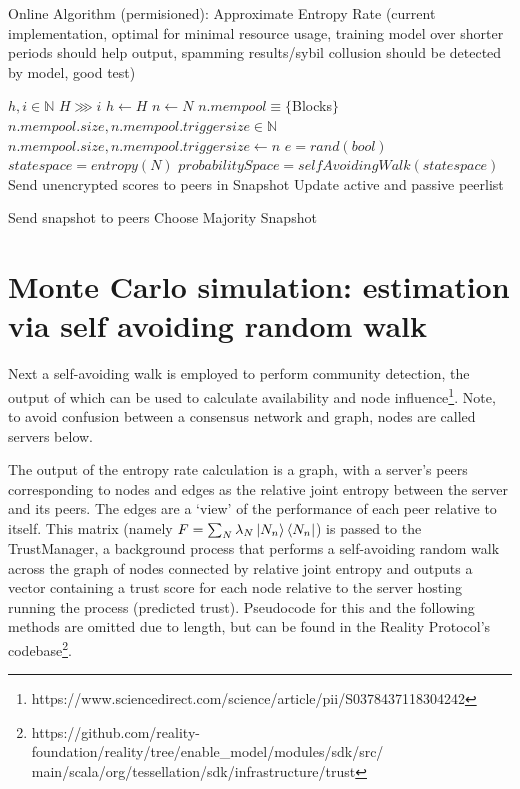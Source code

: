 \documentclass{article}
\begin{document}
\begin{algorithm}
\caption{Online Algorithm (permisioned): Approximate Entropy Rate (current implementation, optimal for minimal resource usage, training model over shorter periods should help output, spamming results/sybil collusion should be detected by model, good test)}\label{alg:cap}
\begin{algorithmic}
\State $h, i \in \mathbb{N}$
\State $H \ggg  i$
\State $h \gets H$
\State $n \gets N$ 
\State $n.mempool \equiv \{ $Blocks$ \}$
\State $n.mempool.size, n.mempool.triggersize \in \mathbb{N}$
\State  $n.mempool.size, n.mempool.triggersize \gets n$ 
\State $e = rand(bool) $ 
		 \State $state space = entropy(N)$ 
   	 	\State $probabilitySpace = selfAvoidingWalk (state space)$  
	 	\State Send unencrypted scores to peers in Snapshot
	 	\State Update active and passive peerlist
		
			\State Send snapshot to peers
			\State Choose Majority Snapshot
	\EndIf
\EndWhile
\end{algorithmic}
\end{algorithm}

\section{Monte Carlo simulation: estimation via self avoiding random walk}
Next a self-avoiding walk is employed to perform community detection, the output of which can be used to calculate availability and node influence\footnote{https://www.sciencedirect.com/science/article/pii/S0378437118304242}. Note, to avoid confusion between a consensus network and graph, nodes are called servers below.

The output of the entropy rate calculation is a graph, with a server’s peers corresponding to nodes and edges as the relative joint entropy between the server and its peers. The edges are a ‘view’ of the performance of each peer relative to itself. This matrix (namely $F = \sum_N \lambda_N \ket{N_n} \bra{N_n}$) is passed to the TrustManager, a background process that performs a self-avoiding random walk across the graph of nodes connected by relative joint entropy and outputs a vector containing a trust score for each node relative to the server hosting running the process (predicted trust). Pseudocode for this and the following methods are omitted due to length, but can be found in the Reality Protocol's codebase\footnote{https://github.com/reality-foundation/reality/tree/enable\_model/modules/sdk/src/\\main/scala/org/tessellation/sdk/infrastructure/trust}.
\end{document}

